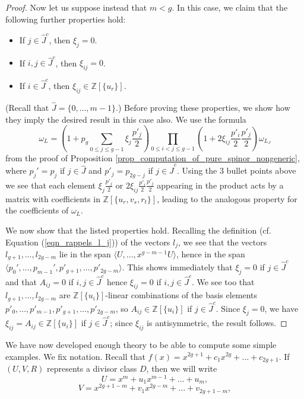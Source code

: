 \documentclass{article} %
\numberwithin{equation}{section}
\newcommand{\Z}{\mathbb{Z}}
\begin{document}
\begin{proof}
    Now let us suppose instead that $m < g$. In this case, we claim that the following further properties hold:
    \begin{itemize}
        \item If $j \in \widehat{J}^c$, then $\xi_j = 0$.
        \item If $i, j \in \widehat{J}^c$, then $\xi_{ij} = 0$.
        \item If $i \in \widehat{J}^c$, then $\xi_{ij} \in \Z[ \{ u_r \} ]$. 
    \end{itemize}
     (Recall that $\widehat{J} = \{ 0, \dots, m-1 \}$.) Before proving these properties, we show how they imply the desired result in this case also. We use the formula 
    \[ \omega_L = \left(1 +   p_g \sum_{0 \leq j \leq g-1} \xi_j \frac{p'_j}{2} \right) \prod_{0 \leq i < j \leq g-1} \left(1 +  2 \xi_{ij} \frac{p'_i}{2} \frac{p'_j}{2} \right) \omega_{L_J} \]
    from the proof of Proposition \ref{prop_computation_of_pure_spinor_nongeneric}, where $p_j' = p_j$ if $j \in \widehat{J}$ and $p'_j = p_{2g-j}$ if $j \in \widehat{J}^c$. Using the 3 bullet points above we see that each element $\xi_j \frac{p'_j}{2}$ or $2 \xi_{ij} \frac{p'_i}{2} \frac{p'_j}{2}$ appearing in the product acts by a matrix with coefficients in $\Z[\{ u_r, v_s, r_t \}]$, leading to the analogous property for the coefficients of $\omega_L$. 

    We now show that the listed properties hold. Recalling the definition (cf. Equation (\ref{eqn_rappels_l_j})) of the vectors $l_j$, we see that the vectors $l_{g+1}, \dots, l_{2g-m}$ lie in the span $\langle U, \dots, x^{g-m-1} U \rangle$, hence in the span $\langle p_0', \dots, p_{m-1}', p'_{g+1}, \dots, p'_{2g-m} \rangle$. This shows immediately that $\xi_j = 0$ if $j \in \widehat{J}^c$ and that $A_{ij} = 0$ if $i, j \in \widehat{J}^c$ hence $\xi_{ij} = 0$ if $i, j \in \widehat{J}^c$. We see too that $l_{g+1}, \dots, l_{2g-m}$ are $\Z[\{ u_i\}]$-linear combinations of the basis elements $p'_0, \dots, p'_{m-1}, p'_{g+1}, \dots, p'_{2g-m}$, so $A_{ij} \in \Z[ \{ u_i \}]$ if $j \in \widehat{J}^c$. Since $\xi_j = 0$, we have $\xi_{ij} = A_{ij} \in \Z[ \{ u_i \}]$ if $j \in \widehat{J}^c$; since $\xi_{ij}$ is antisymmetric, the result follows. 
\end{proof}
We have now developed enough theory to be able to compute some simple examples. We fix notation. Recall that $f(x) = x^{2g+1} + c_{1} x^{2g} + \dots + c_{2g+1}$. If $(U, V, R)$ represents a divisor class $D$, then we will write
\[ U = x^m + u_1 x^{m-1} + \dots + u_m, \]
\[ V = x^{2g+1-m} + v_1 x^{2g-m} + \dots + v_{2g+1-m}, \]
\end{document}
